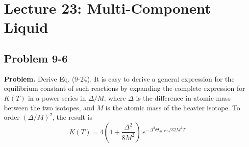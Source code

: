 \documentclass[twocolumn, 10pt]{article}
\numberwithin{equation}{section}
\newenvironment{problem}
{\par\medskip \color{problue}
  \textbf{Problem. }\ignorespaces}
{\medskip}
\begin{document}
\section{Lecture 23: Multi-Component Liquid }

\subsection{Problem 9-6}

\begin{problem}
Derive Eq. (9-24).
It is easy to derive a general expression
for the equilibrium constant of such reactions
by expanding the complete expression for $K(T)$
in a power series in $\Delta/M$,
where $\Delta$ is the difference
in atomic mass between the two isotopes,
and $M$ is the atomic mass of the heavier isotope.
To order $(\Delta/M)^2$, the result is
\begin{equation}
  K(T)
  =
  4\left( 1 + \frac{\Delta^2}{8M^2} \right)
  \, e^{-\Delta^2 \Theta_{M,\mathrm{vib}}/32M^2T}
  \tag{9-24}
  \label{eq:K_iso_MDelta}
\end{equation}
\end{problem}
\end{document}
